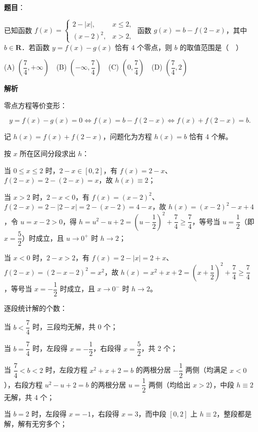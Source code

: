\begin{answer}

\textbf{题目}：

已知函数 $f(x)=\begin{cases}2-|x|,&x\leqslant2,\\(x-2)^2,&x>2,\end{cases}$ 函数 \(g(x)=b-f(2-x)\)，其中 \(b\in\mathbf{R}\)．若函数 \(y=f(x)-g(x)\) 恰有 4 个零点，则 \(b\) 的取值范围是（　）

(A) \(\left(\dfrac{7}{4},+\infty\right)\)　(B) \(\left(-\infty,\dfrac{7}{4}\right)\)　(C) \(\left(0,\dfrac{7}{4}\right)\)　(D) \(\left(\dfrac{7}{4},2\right)\)

\textbf{解析}

零点方程等价变形：

\nopagebreak[4]
\[
y=f(x)-g(x)=0\iff f(x)=b-f(2-x)\iff f(x)+f(2-x)=b.
\]

记 \(h(x)=f(x)+f(2-x)\)，问题化为方程 \(h(x)=b\) 恰有 4 个解。

按 \(x\) 所在区间分段求出 \(h\)：

当 \(0\leqslant x\leqslant 2\) 时，\(2-x\in[0,2]\)，有 \(f(x)=2-x\)、\(f(2-x)=2-(2-x)=x\)，故 \(h(x)\equiv 2\)；

当 \(x>2\) 时，\(2-x<0\)，有 \(f(x)=(x-2)^2\)、\(f(2-x)=2-|2-x|=2-(x-2)=4-x\)，故 \(h(x)=(x-2)^2-x+4\)，令 \(u=x-2>0\)，得 \(h=u^2-u+2=\left(u-\dfrac{1}{2}\right)^2+\dfrac{7}{4}\geqslant\dfrac{7}{4}\)，等号当 \(u=\dfrac{1}{2}\)（即 \(x=\dfrac{5}{2}\)）时成立，且 \(u\to 0^+\) 时 \(h\to 2\)；

当 \(x<0\) 时，\(2-x>2\)，有 \(f(x)=2-|x|=2+x\)、\(f(2-x)=(2-x-2)^2=x^2\)，故 \(h(x)=x^2+x+2=\left(x+\dfrac{1}{2}\right)^2+\dfrac{7}{4}\geqslant\dfrac{7}{4}\)，等号当 \(x=-\dfrac{1}{2}\) 时成立，且 \(x\to 0^-\) 时 \(h\to 2\)。

逐段统计解的个数：

当 \(b<\dfrac{7}{4}\) 时，三段均无解，共 0 个；

当 \(b=\dfrac{7}{4}\) 时，左段得 \(x=-\dfrac{1}{2}\)，右段得 \(x=\dfrac{5}{2}\)，共 2 个；

当 \(\dfrac{7}{4}<b<2\) 时，左段方程 \(x^2+x+2=b\) 的两根分居 \(-\dfrac{1}{2}\) 两侧（均满足 \(x<0\)），右段方程 \(u^2-u+2=b\) 的两根分居 \(u=\dfrac{1}{2}\) 两侧（均给出 \(x>2\)），中段 \(h\equiv 2\) 无解，共 4 个；

当 \(b=2\) 时，左段得 \(x=-1\)，右段得 \(x=3\)，而中段 \([0,2]\) 上 \(h\equiv 2\)，整段都是解，解有无穷多个；


\end{answer}
